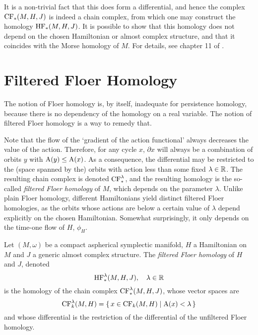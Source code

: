 It is a non-trivial fact that this does form a differential, and hence the complex $\CF_*(M,H,J)$ is indeed a chain complex, from which one may construct the homology $\HF_*(M,H,J)$. It is possible to show that this homology does not depend on the chosen Hamiltonian or almost complex structure, and that it coincides with the Morse homology of $M$. For details, see chapter 11 of \cite{audin}.

\section{Filtered Floer Homology}

The notion of Floer homology is, by itself, inadequate for persistence homology, because there is no dependency of the homology on a real variable. The notion of filtered Floer homology is a way to remedy that.

Note that the flow of the `gradient of the action functional' always decreases the value of the action. Therefore, for any cycle $x$, $\partial x$ will always be a combination of orbits $y$ with $\AA(y) \leq \AA(x)$. As a consequence, the differential may be restricted to the (space spanned by the) orbits with action less than some fixed $\lambda \in \R$. The resulting chain complex is denoted $\CF_*^\lambda$, and the resulting homology is the so-called \emph{filtered Floer homology} of $M$, which depends on the parameter $\lambda$. Unlike plain Floer homology, different Hamiltonians yield distinct filtered Floer homologies, as the orbits whose actions are below a certain value of $\lambda$ depend explicitly on the chosen Hamiltonian. Somewhat surprisingly, it only depends on the time-one flow of $H$, $\phi_H$.

\begin{definition}
Let $(M,\omega)$ be a compact aspherical symplectic manifold, $H$ a Hamiltonian on $M$ and $J$ a generic almost complex structure. The \emph{filtered Floer homology} of $H$ and $J$, denoted
\begin{equation}
\HF^\lambda_*(M,H,J), \quad \lambda \in \R
\end{equation}
is the homology of the chain complex $\CF^\lambda_*(M,H,J)$, whose vector spaces are
\begin{equation}
\CF^\lambda_k(M,H) = \{\, x \in \CF_k(M,H) \mid \AA(x) < \lambda\,\}
\end{equation}
and whose differential is the restriction of the differential of the unfiltered Floer homology.
\end{definition}

